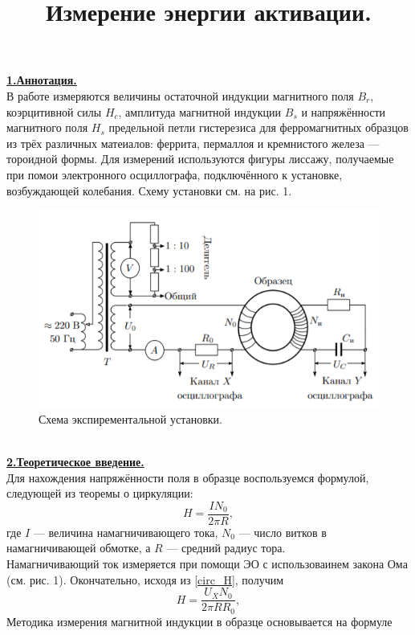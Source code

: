 \documentclass[12pt, letterpaper, oneside]{article}
\title{Измерение энергии активации.}
\begin{document}
\maketitle
\noindent\textbf{\underline{1.Аннотация.}}\\
В работе измеряются величины остаточной индукции магнитного поля $B_r$, коэрцитивной силы $H_c$, амплитуда магнитной индукции $B_s$ и напряжённости магнитного поля $H_s$ предельной петли гистерезиса для ферромагнитных образцов из трёх различных матеиалов: феррита, пермаллоя и кремнистого железа — тороидной формы. Для измерений используются фигуры лиссажу, получаемые при помои электронного осциллографа, подключённого к установке, возбуждающей колебания. Схему установки см. на рис. 1.\\
\begin{figure}[h]
\centering
\includegraphics{scheme.png}
\caption{Схема экспирементальной установки.}
\end{figure}\\
\textbf{\underline{2.Теоретическое введение.}}\\
Для нахождения напряжённости поля в образце воспользуемся формулой, следующей из теоремы о циркуляции:
\begin{equation}\label{circ_H}
H = \frac{I N_0}{2\pi R},
\end{equation}
где $I$ — величина намагничивающего тока, $N_0$ — число витков в намагничивающей обмотке, а $R$ — средний радиус тора.\\
Намагничивающий ток измеряется при помощи ЭО с использоваинем закона Ома (см. рис. 1). Окончательно, исходя из \ref{circ_H}, получим
\begin{equation}\label{X_formula}
H = \frac{U_X N_0}{2\pi R R_0},
\end{equation}
Методика измерения магнитной индукции в образце основывается на формуле
\end{document}
